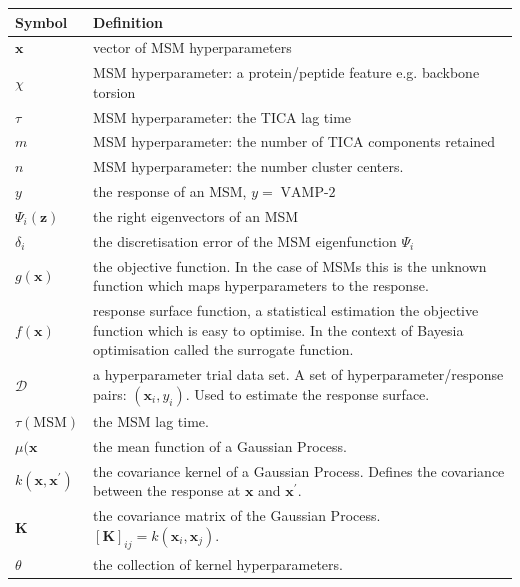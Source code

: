 \begin{table}
    \centering
    \begin{tabularx}{0.9\textwidth}{ |l| >{\raggedright\arraybackslash}X | } 
    \hline
        \textbf{Symbol}  &  \textbf{Definition} \\
        \hline\hline
        $\mathbf{x}$ & vector of MSM hyperparameters \\
        $\chi$ & MSM hyperparameter: a protein/peptide feature e.g. backbone torsion \\
        $\tau$ & MSM hyperparameter: the TICA lag time \\
        $m$ & MSM hyperparameter: the number of TICA components retained \\
        $n$ & MSM hyperparameter: the number cluster centers. \\
        $y$ & the response of an MSM, $y =\operatorname{VAMP-2}$ \\
        $\Psi_i(\mathbf{z})$ & the right eigenvectors of an MSM \\
        $\delta_i$ & the discretisation error of the MSM eigenfunction $\Psi_{i}$ \\
        $g(\mathbf{x})$ & the objective function. In the case of MSMs this is the unknown function 
                            which maps hyperparameters to the response. \\
        $f(\mathbf{x})$ & response surface function, a statistical estimation the objective function 
                          which is easy to optimise. In the context of Bayesia optimisation called the 
                          surrogate function. \\
        $\mathcal{D}$ & a hyperparameter trial data set. A set of hyperparameter/response pairs: $(\mathbf{x}_{i}, y_{i})$. Used to estimate the response surface. \\
        $\tau(\mathrm{MSM})$ & the MSM lag time.  \\
        $\mu(\mathbf{x}$ & the mean function of a Gaussian Process. \\
        $k(\mathbf{x}, \mathbf{x}^{\prime})$ & the covariance kernel of a Gaussian Process. Defines the covariance between the response at $\mathbf{x}$ and $\mathbf{x}^{\prime}$. \\
        $\mathbf{K}$ & the covariance matrix of the Gaussian Process. $[\mathbf{K}]_{ij} =k(\mathbf{x}_{i}, \mathbf{x}_{j})$. \\
        $\theta$ & the collection of kernel hyperparameters. \\

\end{tabularx}
\end{table}
